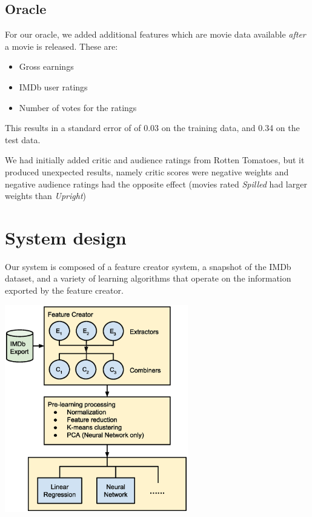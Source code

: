 \documentclass[journal]{IEEEtran}
\begin{document}
\subsection{Oracle}
For our oracle, we added additional features which are movie data available
\emph{after} a movie is released. These are:
\\
\begin{itemize}
	\item Gross earnings
	\item IMDb user ratings
	\item Number of votes for the ratings
\end{itemize}
\bigskip
\par This results in a standard error of of 0.03 on the training data, and 0.34 on the test data.
\\
\par We had initially added critic and audience ratings from Rotten Tomatoes, but it produced unexpected results, namely critic scores were negative weights and negative audience ratings had the opposite effect (movies rated \emph{Spilled} had larger weights than \emph{Upright})

\section{System design}
Our system is composed of a feature creator system, a snapshot of the IMDb dataset,
and a variety of learning algorithms that operate on the information exported by
the feature creator.

\begin{center}
    \includegraphics[width=8cm]{charts/system.eps}
\end{center}
\end{document}
